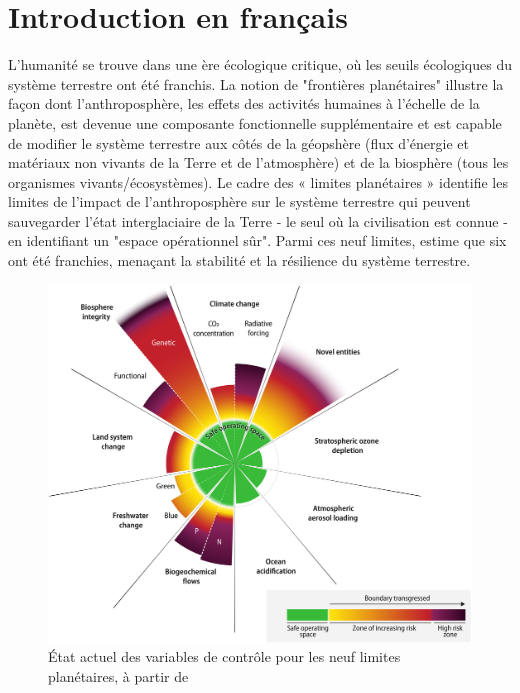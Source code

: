 {}
\onehalfspacing
\chapter*{Introduction en français }

L'humanité se trouve dans une ère écologique critique, où les seuils écologiques du système terrestre ont été franchis. La notion de "frontières planétaires" \citep{rockstrom2009safe,steffen_2015_planetary} illustre la façon dont l'anthroposphère, les effets des activités humaines à l'échelle de la planète, est devenue une composante fonctionnelle supplémentaire et est capable de modifier le système terrestre \citep{richardson_earth_2023} aux côtés de la géopshère (flux d'énergie et matériaux non vivants de la Terre et de l'atmosphère) et de la biosphère (tous les organismes vivants/écosystèmes). Le cadre des « limites planétaires » identifie les limites de l'impact de l'anthroposphère sur le système terrestre qui peuvent sauvegarder l'état interglaciaire de la Terre - le seul où la civilisation est connue - en identifiant un "espace opérationnel sûr". Parmi ces neuf limites, \cite{richardson_earth_2023} estime que six ont été franchies, menaçant la stabilité et la résilience du système terrestre. 

\begin{figure}[h]
	\centering
	\includegraphics[width= .7\textwidth]{figures/intro/planetary_bounds.jpg}
	\caption{État actuel des variables de contrôle pour les neuf limites planétaires, à partir de \cite{richardson_earth_2023}}
\end{figure}

